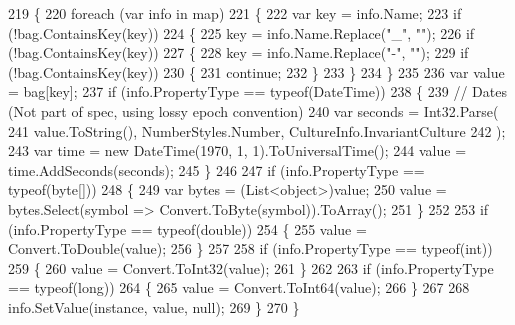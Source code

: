 \begin{DoxyCode}
219         \{
220             \textcolor{keywordflow}{foreach} (var info \textcolor{keywordflow}{in} map)
221             \{
222                 var key = info.Name;
223                 \textcolor{keywordflow}{if} (!bag.ContainsKey(key))
224                 \{
225                     key = info.Name.Replace(\textcolor{stringliteral}{"\_"}, \textcolor{stringliteral}{""});
226                     \textcolor{keywordflow}{if} (!bag.ContainsKey(key))
227                     \{
228                         key = info.Name.Replace(\textcolor{stringliteral}{"-"}, \textcolor{stringliteral}{""});
229                         \textcolor{keywordflow}{if} (!bag.ContainsKey(key))
230                         \{
231                             \textcolor{keywordflow}{continue};
232                         \}
233                     \}
234                 \}
235 
236                 var value = bag[key];
237                 \textcolor{keywordflow}{if} (info.PropertyType == typeof(DateTime))
238                 \{
239                     \textcolor{comment}{// Dates (Not part of spec, using lossy epoch convention)}
240                     var seconds = Int32.Parse(
241                         value.ToString(), NumberStyles.Number, CultureInfo.InvariantCulture
242                         );
243                     var time = \textcolor{keyword}{new} DateTime(1970, 1, 1).ToUniversalTime();
244                     value = time.AddSeconds(seconds);
245                 \}
246 
247                 \textcolor{keywordflow}{if} (info.PropertyType == typeof(byte[]))
248                 \{
249                     var bytes = (List<object>)value;
250                     value = bytes.Select(symbol => Convert.ToByte(symbol)).ToArray();
251                 \}
252 
253                 \textcolor{keywordflow}{if} (info.PropertyType == typeof(\textcolor{keywordtype}{double}))
254                 \{
255                     value = Convert.ToDouble(value);
256                 \}
257 
258                 \textcolor{keywordflow}{if} (info.PropertyType == typeof(\textcolor{keywordtype}{int}))
259                 \{
260                     value = Convert.ToInt32(value);
261                 \}
262 
263                 \textcolor{keywordflow}{if} (info.PropertyType == typeof(\textcolor{keywordtype}{long}))
264                 \{
265                     value = Convert.ToInt64(value);
266                 \}
267 
268                 info.SetValue(instance, value, null);
269             \}
270         \}
\end{DoxyCode}
